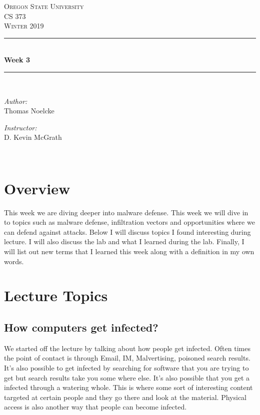 \documentclass[letterpaper, onecolumn,10pt]{IEEEtran}
\begin{document}
    \begin{titlepage}
    \newcommand{\HRule}{\rule{\linewidth}{0.5mm}}
    \center
    \textsc{\Large Oregon State University}\\[1.5cm]
    \textsc{\Large CS 373}\\[0.5cm]
    \textsc{\Large Winter 2019}\\[0.5cm]
    \HRule \\[0.4cm]
    { \huge \bfseries Week 3}\\[0.4cm] %
    \HRule \\[1.5cm]
    \begin{minipage}{0.4\textwidth}
        \begin{flushleft} \large
        \emph{Author:}\\
        Thomas Noelcke
        \end{flushleft}
    \end{minipage}
    \begin{minipage}{0.4\textwidth}
        \begin{flushright} \large
        \emph{Instructor:} \\
        D. Kevin McGrath\\
        \end{flushright}
    \end{minipage}\\[2cm]
		\end{titlepage}
		
		
        \section{Overview}
        This week we are diving deeper into malware defense. This week we will dive in to topics such as malware defense, infiltration vectors and opportunities where we can defend against attacks. Below I will discuss topics I found interesting during lecture. I will also discuss the lab and what I learned during the lab. Finally, I will list out new terms that I learned this week along with a definition in my own words.\\
			
        \section{Lecture Topics}
            
            \subsection{How computers get infected?}
            We started off the lecture by talking about how people get infected. Often times the point of contact is through Email, IM, Malvertising, poisoned search results. It's also possible to get infected by searching for software that you are trying to get but search results take you some where else. It's also possible that you get a infected through a watering whole. This is where some sort of interesting content targeted at certain people and they go there and look at the material. Physical access is also another way that people can become infected.\\
            
\end{document}
